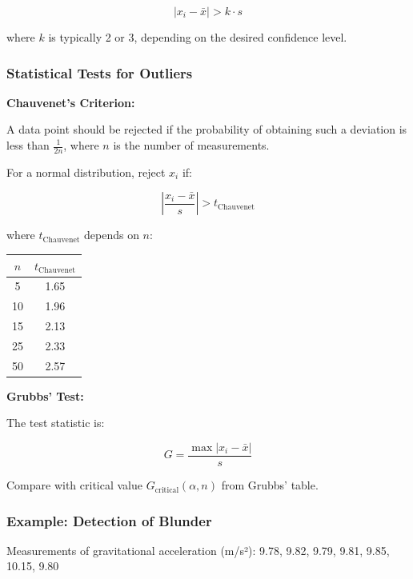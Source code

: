 \documentclass[twoside]{book}
\begin{document}
\begin{equation*}
|x_i - \bar{x}| > k \cdot s
\end{equation*}

where $k$ is typically 2 or 3, depending on the desired confidence level.

\subsubsection{Statistical Tests for Outliers}

\textbf{Chauvenet's Criterion:}

A data point should be rejected if the probability of obtaining such a deviation is less than $\frac{1}{2n}$, where $n$ is the number of measurements.

For a normal distribution, reject $x_i$ if:

\begin{equation}
\left|\frac{x_i - \bar{x}}{s}\right| > t_{\text{Chauvenet}}
\end{equation}

where $t_{\text{Chauvenet}}$ depends on $n$:

\begin{center}
\begin{tabular}{cc}
\toprule
$n$ & $t_{\text{Chauvenet}}$ \\
\midrule
5 & 1.65 \\
10 & 1.96 \\
15 & 2.13 \\
25 & 2.33 \\
50 & 2.57 \\
\bottomrule
\end{tabular}
\end{center}

\textbf{Grubbs' Test:}

The test statistic is:

\begin{equation}
G = \frac{\max|x_i - \bar{x}|}{s}
\end{equation}

Compare with critical value $G_{\text{critical}}(\alpha, n)$ from Grubbs' table.

\subsubsection{Example: Detection of Blunder}

Measurements of gravitational acceleration (m/s²):
9.78, 9.82, 9.79, 9.81, 9.85, 10.15, 9.80
\end{document}
